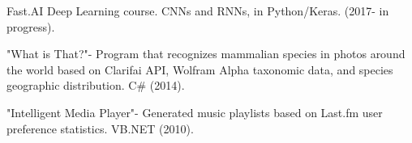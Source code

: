 \documentclass[letterpaper]{deedy-resume} %
\begin{document}
\begin{minipage}[t]{0.64\textwidth}

\descript{}
\begin{tightitemize}
\item Fast.AI Deep Learning course. CNNs and RNNs, in Python/Keras. (2017- in progress).
\item "What is That?"- Program that recognizes mammalian species in photos around the world based on Clarifai API, Wolfram Alpha taxonomic data, and species geographic distribution.  C\# (2014).
\item "Intelligent Media Player"- Generated music playlists based on Last.fm user preference statistics.  VB.NET (2010).
\end{tightitemize}
\vspace{\topsep} %

\end{minipage} %
\end{document}
